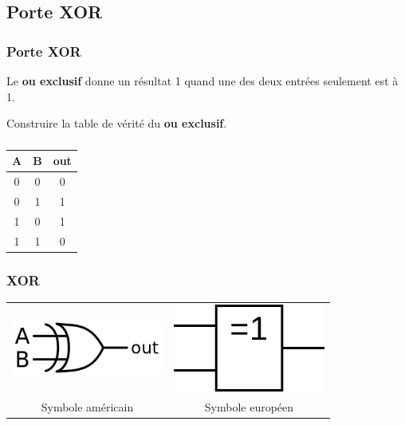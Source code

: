 \documentclass[svgnames,11pt]{beamer}
\begin{document}
\subsection{Porte XOR}
\begin{frame}
    \frametitle{Porte XOR}

    \begin{aretenir}[]
    Le \textbf{ou exclusif} donne un résultat 1  quand une des deux entrées seulement est à 1.
    \end{aretenir}
\begin{activite}
Construire la table de vérité du \textbf{ou exclusif}.
\end{activite}
\end{frame}
\begin{frame}
    \frametitle{}

    \begin{center}
        \begin{tabular}{|c|c|c|}
            \hline
            A & B & out \\
            \hline
            0 & 0 & 0   \\
            \hline
            0 & 1 & 1   \\
            \hline
            1 & 0 & 1   \\
            \hline
            1 & 1 & 0   \\
            \hline
        \end{tabular}
    \end{center}

\end{frame}
\begin{frame}
    \frametitle{XOR}
    \begin{tabular}{cc}
        \includegraphics[width=5cm]{ressources/xor-us.png}
                          &
        \includegraphics[width=5cm]{ressources/xor-eu.png}
        \\
        Symbole américain & Symbole européen \\
    \end{tabular}


\end{frame}
\end{document}
